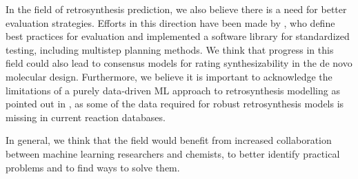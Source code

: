 In the field of retrosynthesis prediction, we also believe there is a need for better evaluation
strategies. Efforts in this direction have been made by
\citet{maziarzReevaluatingRetrosynthesisAlgorithms2024}, who define best practices for evaluation
and implemented a software library for standardized testing, including multistep planning methods.
We think that progress in this field could also lead to consensus models for rating synthesizability
in the de novo molecular design. Furthermore, we believe it is important to acknowledge the
limitations of a purely data-driven ML approach to retrosynthesis modelling as pointed out in
\citep{strieth-kalthoffArtificialIntelligenceRetrosynthetic2024}, as some of the data required for
robust retrosynthesis models is missing in current reaction databases.

In general, we think that the field would benefit from increased collaboration between machine
learning researchers and chemists, to better identify practical problems
\citep{benderArtificialIntelligenceDrug2021} and to find ways to solve them.


